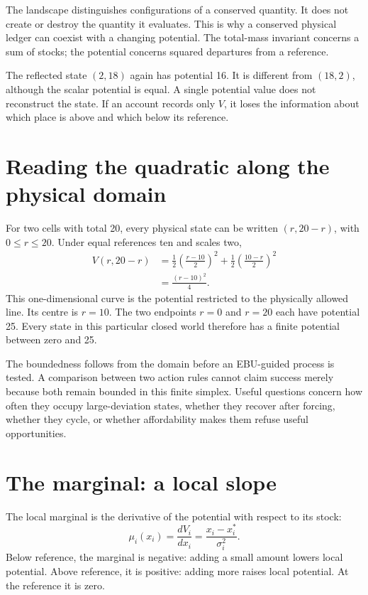 The landscape distinguishes configurations of a conserved quantity. It does not create or destroy the quantity it evaluates. This is why a conserved physical ledger can coexist with a changing potential. The total-mass invariant concerns a sum of stocks; the potential concerns squared departures from a reference.

The reflected state \((2,18)\) again has potential 16. It is different from \((18,2)\), although the scalar potential is equal. A single potential value does not reconstruct the state. If an account records only \(V\), it loses the information about which place is above and which below its reference.

\section{Reading the quadratic along the physical domain}
For two cells with total 20, every physical state can be written \((r,20-r)\), with \(0\leq r\leq20\). Under equal references ten and scales two,
\begin{align}
 V(r,20-r)
 &=\frac12\left(\frac{r-10}{2}\right)^2
  +\frac12\left(\frac{10-r}{2}\right)^2\\
 &=\frac{(r-10)^2}{4}.
\end{align}
This one-dimensional curve is the potential restricted to the physically allowed line. Its centre is \(r=10\). The two endpoints \(r=0\) and \(r=20\) each have potential 25. Every state in this particular closed world therefore has a finite potential between zero and 25.

The boundedness follows from the domain before an EBU-guided process is tested. A comparison between two action rules cannot claim success merely because both remain bounded in this finite simplex. Useful questions concern how often they occupy large-deviation states, whether they recover after forcing, whether they cycle, or whether affordability makes them refuse useful opportunities.

\section{The marginal: a local slope}
The local marginal is the derivative of the potential with respect to its stock:
\begin{equation}\label{eq:gaussian-marginal}
 \mu_i(x_i)=\frac{dV_i}{dx_i}
           =\frac{x_i-x_i^*}{\sigma_i^2}.
\end{equation}
Below reference, the marginal is negative: adding a small amount lowers local potential. Above reference, it is positive: adding more raises local potential. At the reference it is zero.

